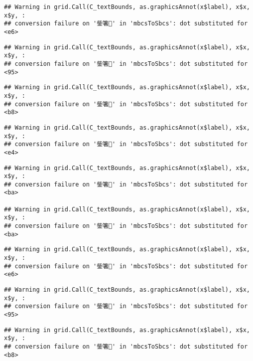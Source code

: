 \documentclass[
]{article}
\begin{document}
\begin{verbatim}
## Warning in grid.Call(C_textBounds, as.graphicsAnnot(x$label), x$x, x$y, :
## conversion failure on '鈭箸' in 'mbcsToSbcs': dot substituted for <e6>
\end{verbatim}

\begin{verbatim}
## Warning in grid.Call(C_textBounds, as.graphicsAnnot(x$label), x$x, x$y, :
## conversion failure on '鈭箸' in 'mbcsToSbcs': dot substituted for <95>
\end{verbatim}

\begin{verbatim}
## Warning in grid.Call(C_textBounds, as.graphicsAnnot(x$label), x$x, x$y, :
## conversion failure on '鈭箸' in 'mbcsToSbcs': dot substituted for <b8>
\end{verbatim}

\begin{verbatim}
## Warning in grid.Call(C_textBounds, as.graphicsAnnot(x$label), x$x, x$y, :
## conversion failure on '鈭箸' in 'mbcsToSbcs': dot substituted for <e4>
\end{verbatim}

\begin{verbatim}
## Warning in grid.Call(C_textBounds, as.graphicsAnnot(x$label), x$x, x$y, :
## conversion failure on '鈭箸' in 'mbcsToSbcs': dot substituted for <ba>

## Warning in grid.Call(C_textBounds, as.graphicsAnnot(x$label), x$x, x$y, :
## conversion failure on '鈭箸' in 'mbcsToSbcs': dot substituted for <ba>
\end{verbatim}

\begin{verbatim}
## Warning in grid.Call(C_textBounds, as.graphicsAnnot(x$label), x$x, x$y, :
## conversion failure on '鈭箸' in 'mbcsToSbcs': dot substituted for <e6>
\end{verbatim}

\begin{verbatim}
## Warning in grid.Call(C_textBounds, as.graphicsAnnot(x$label), x$x, x$y, :
## conversion failure on '鈭箸' in 'mbcsToSbcs': dot substituted for <95>
\end{verbatim}

\begin{verbatim}
## Warning in grid.Call(C_textBounds, as.graphicsAnnot(x$label), x$x, x$y, :
## conversion failure on '鈭箸' in 'mbcsToSbcs': dot substituted for <b8>
\end{verbatim}
\end{document}
